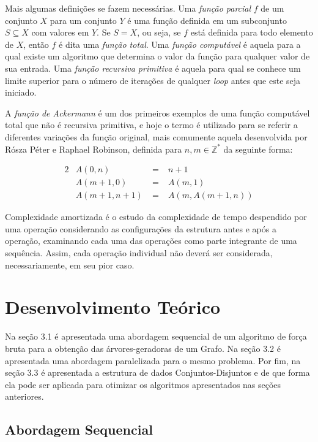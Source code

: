 \documentclass[article,a4paper,12pt,brazil,sumario=tradicional]{abntex2}
\theoremstyle{definition} %
\begin{document}
Mais algumas definições se fazem necessárias. Uma \textit{função parcial} $f$ de um conjunto $X$ para um conjunto $Y$ é uma função definida em um subconjunto $S \subseteq X$ com valores em $Y$. Se $S = X$, ou seja, se $f$ está definida para todo elemento de $X$, então $f$ é dita uma \textit{função total}. Uma \textit{função computável} é aquela para a qual existe um algoritmo que determina o valor da função para qualquer valor de sua entrada. Uma \textit{função recursiva primitiva} é aquela para qual se conhece um limite superior para o número de iterações de qualquer \textit{loop} antes que este seja iniciado.

A \textit{função de Ackermann}\cite{Ackermann1928} é um dos primeiros exemplos de uma função computável total que não é recursiva primitiva, e hoje o termo é utilizado para se referir a diferentes variações da função original, mais comumente aquela desenvolvida por Rósza Péter e Raphael Robinson, definida para $n,m \in \mathbb{Z}^*$ da seguinte forma:

\begin{alignat*}{2}
    &A(0, n) &\;=\;&n + 1 \\
    &A(m+1, 0) &\;=\;& A(m, 1) \\
    &A(m+1, n+1) &\;=\;& A(m, A(m+1, n))
\end{alignat*}


Complexidade amortizada é o estudo da complexidade de tempo despendido por uma operação considerando as configurações da estrutura antes e após a operação, examinando cada uma das operações como parte integrante de uma sequência. Assim, cada operação individual não deverá ser considerada, necessariamente, em seu pior caso\cite{szwarcfiter1994estruturas}.

\section{Desenvolvimento Teórico}

Na seção 3.1 é apresentada uma abordagem sequencial de um algoritmo de força bruta para a obtenção das árvores-geradoras de um Grafo. Na seção 3.2 é apresentada uma abordagem paralelizada para o mesmo problema. Por fim, na seção 3.3 é apresentada a estrutura de dados Conjuntos-Disjuntos e de que forma ela pode ser aplicada para otimizar os algoritmos apresentados nas seções anteriores.

\subsection{Abordagem Sequencial}
\label{abordagem-sequencial}
\end{document}
